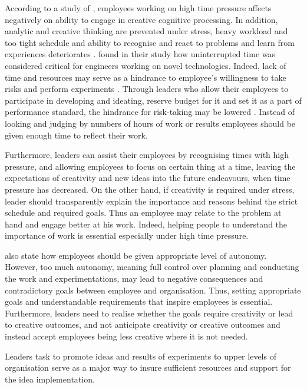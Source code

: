 According to a study of \citet{amabile2002creativity}, employees working on high time pressure affects negatively on ability to engage in creative cognitive processing. In addition, analytic and creative thinking are prevented under stress, heavy workload and too tight schedule and ability to recognise and react to problems and learn from experiences deteriorates \citep{garvin2008yours}.  \citet{katz1985project} found in their study how uninterrupted time was considered critical for engineers working on novel technologies. Indeed, lack of time and resources may serve as a hindrance to employee's willingness to take risks and perform experiments \citep{jung2003role}. Through leaders who allow their employees to participate in developing and ideating, reserve budget for it and set it as a part of performance standard, the hindrance for risk-taking may be lowered \citep{jung2003role}. Instead of looking and judging by numbers of hours of work or results employees should be given enough time to reflect their work. 
 
Furthermore, leaders can assist their employees by recognising times with high pressure, and allowing employees to focus on certain thing at a time, leaving the expectations of creativity and new ideas into the future endeavours, when time pressure has decreased. On the other hand, if creativity is required under stress, leader should transparently explain the importance and reasons behind the strict schedule and required goals. Thus an employee may relate to the problem at hand and engage better at his work. Indeed, helping people to understand the importance of work is essential especially under high time pressure. \citep{amabile2002creativity}

\citet{shalley2004leaders} also state how employees should be given appropriate level of autonomy. However, too much autonomy, meaning full control over planning and conducting the work and experimentations, may lead to negative consequences and contradictory goals between employee and organisation. Thus, setting appropriate goals and understandable requirements that inspire employees is essential. Furthermore, leaders need to realise whether the goals require creativity or lead to creative outcomes, and not anticipate creativity or creative outcomes and instead accept employees being less creative where it is not needed. \citep{shalley2004leaders} 

Leaders task to promote ideas and results of experiments to upper levels of organisation serve as a major way to insure sufficient resources and support for the idea implementation. \citep{mumford2002leading} 

